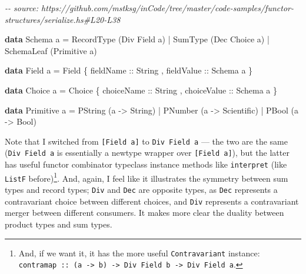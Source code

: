 \documentclass[]{article}
\newenvironment{Shaded}{}{}
\newcommand{\CommentTok}[1]{\textcolor[rgb]{0.38,0.63,0.69}{\textit{#1}}}
\newcommand{\DataTypeTok}[1]{\textcolor[rgb]{0.56,0.13,0.00}{#1}}
\newcommand{\KeywordTok}[1]{\textcolor[rgb]{0.00,0.44,0.13}{\textbf{#1}}}
\newcommand{\NormalTok}[1]{#1}
\newcommand{\OperatorTok}[1]{\textcolor[rgb]{0.40,0.40,0.40}{#1}}
\newcommand{\OtherTok}[1]{\textcolor[rgb]{0.00,0.44,0.13}{#1}}
\begin{document}
\begin{Shaded}
\begin{Highlighting}[]
\CommentTok{{-}{-} source: https://github.com/mstksg/inCode/tree/master/code{-}samples/functor{-}structures/serialize.hs\#L20{-}L38}

\KeywordTok{data} \DataTypeTok{Schema}\NormalTok{ a }\OtherTok{=}
      \DataTypeTok{RecordType}\NormalTok{  (}\DataTypeTok{Div} \DataTypeTok{Field}\NormalTok{  a)}
    \OperatorTok{|} \DataTypeTok{SumType}\NormalTok{     (}\DataTypeTok{Dec} \DataTypeTok{Choice}\NormalTok{ a)}
    \OperatorTok{|} \DataTypeTok{SchemaLeaf}\NormalTok{  (}\DataTypeTok{Primitive}\NormalTok{ a)}

\KeywordTok{data} \DataTypeTok{Field}\NormalTok{ a }\OtherTok{=} \DataTypeTok{Field}
\NormalTok{    \{}\OtherTok{ fieldName  ::} \DataTypeTok{String}
\NormalTok{    ,}\OtherTok{ fieldValue ::} \DataTypeTok{Schema}\NormalTok{ a}
\NormalTok{    \}}

\KeywordTok{data} \DataTypeTok{Choice}\NormalTok{ a }\OtherTok{=} \DataTypeTok{Choice}
\NormalTok{    \{}\OtherTok{ choiceName  ::} \DataTypeTok{String}
\NormalTok{    ,}\OtherTok{ choiceValue ::} \DataTypeTok{Schema}\NormalTok{ a}
\NormalTok{    \}}

\KeywordTok{data} \DataTypeTok{Primitive}\NormalTok{ a }\OtherTok{=}
      \DataTypeTok{PString}\NormalTok{ (a }\OtherTok{{-}>} \DataTypeTok{String}\NormalTok{)}
    \OperatorTok{|} \DataTypeTok{PNumber}\NormalTok{ (a }\OtherTok{{-}>} \DataTypeTok{Scientific}\NormalTok{)}
    \OperatorTok{|} \DataTypeTok{PBool}\NormalTok{   (a }\OtherTok{{-}>} \DataTypeTok{Bool}\NormalTok{)}
\end{Highlighting}
\end{Shaded}

Note that I switched from \texttt{{[}Field\ a{]}} to \texttt{Div\ Field\ a} ---
the two are the same (\texttt{Div\ Field\ a} is essentially a newtype wrapper
over \texttt{{[}Field\ a{]}}), but the latter has useful functor combinator
typeclass instance methods like \texttt{interpret} (like \texttt{ListF}
before)\footnote{And, if we want it, it has the more useful
  \texttt{Contravariant} instance:
  \texttt{contramap\ ::\ (a\ -\textgreater{}\ b)\ -\textgreater{}\ Div\ Field\ b\ -\textgreater{}\ Div\ Field\ a}.}.
And, again, I feel like it illustrates the symmetry between sum types and record
types; \texttt{Div} and \texttt{Dec} are opposite types, as \texttt{Dec}
represents a contravariant choice between different choices, and \texttt{Div}
represents a contravariant merger between different consumers. It makes more
clear the duality between product types and sum types.
\end{document}
